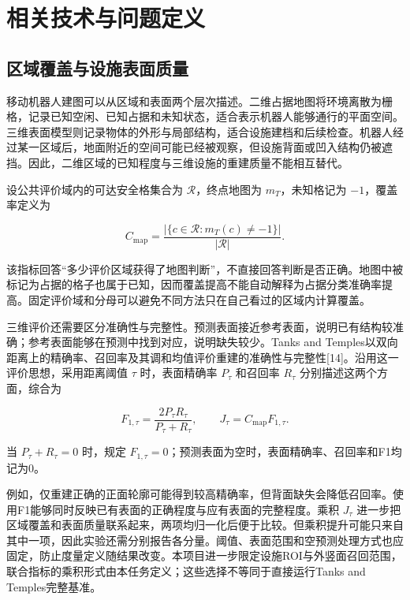 \documentclass[11pt,a4paper]{article}
\numberwithin{equation}{section}
\begin{document}
\hypertarget{ux76f8ux5173ux6280ux672fux4e0eux95eeux9898ux5b9aux4e49}{%
\clearpage
\section{相关技术与问题定义}\label{ux76f8ux5173ux6280ux672fux4e0eux95eeux9898ux5b9aux4e49}}

\hypertarget{ux533aux57dfux8986ux76d6ux4e0eux8bbeux65bdux8868ux9762ux8d28ux91cf}{%
\subsection{区域覆盖与设施表面质量}\label{ux533aux57dfux8986ux76d6ux4e0eux8bbeux65bdux8868ux9762ux8d28ux91cf}}

移动机器人建图可以从区域和表面两个层次描述。二维占据地图将环境离散为栅格，记录已知空闲、已知占据和未知状态，适合表示机器人能够通行的平面空间。三维表面模型则记录物体的外形与局部结构，适合设施建档和后续检查。机器人经过某一区域后，地面附近的空间可能已经被观察，但设施背面或凹入结构仍被遮挡。因此，二维区域的已知程度与三维设施的重建质量不能相互替代。

设公共评价域内的可达安全格集合为 \(\mathcal R\)，终点地图为 \(m_T\)，未知格记为 \(-1\)，覆盖率定义为

\begin{equation}
C_{\mathrm{map}}=
\frac{|\{c\in\mathcal R:m_T(c)\ne-1\}|}{|\mathcal R|}.
\end{equation}

该指标回答``多少评价区域获得了地图判断''，不直接回答判断是否正确。地图中被标记为占据的格子也属于已知，因而覆盖提高不能自动解释为占据分类准确率提高。固定评价域和分母可以避免不同方法只在自己看过的区域内计算覆盖。

三维评价还需要区分准确性与完整性。预测表面接近参考表面，说明已有结构较准确；参考表面能够在预测中找到对应，说明缺失较少。Tanks and Temples以双向距离上的精确率、召回率及其调和均值评价重建的准确性与完整性{[}14{]}。沿用这一评价思想，采用距离阈值 \(\tau\) 时，表面精确率 \(P_\tau\) 和召回率 \(R_\tau\) 分别描述这两个方面，综合为

\begin{equation}
F_{1,\tau}=\frac{2P_\tau R_\tau}{P_\tau+R_\tau},
\qquad J_\tau=C_{\mathrm{map}}F_{1,\tau}.
\end{equation}

当 \(P_\tau+R_\tau=0\) 时，规定 \(F_{1,\tau}=0\)；预测表面为空时，表面精确率、召回率和F1均记为0。

例如，仅重建正确的正面轮廓可能得到较高精确率，但背面缺失会降低召回率。使用F1能够同时反映已有表面的正确程度与应有表面的完整程度。乘积 \(J_\tau\) 进一步把区域覆盖和表面质量联系起来，两项均归一化后便于比较。但乘积提升可能只来自其中一项，因此实验还需分别报告各分量。阈值、表面范围和空预测处理方式也应固定，防止度量定义随结果改变。本项目进一步限定设施ROI与外竖面召回范围，联合指标的乘积形式由本任务定义；这些选择不等同于直接运行Tanks and Temples完整基准。
\end{document}

